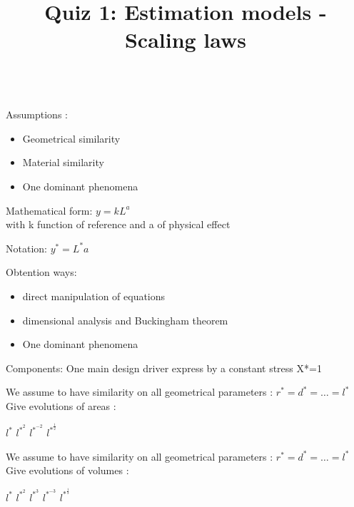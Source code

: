 \documentclass{webquiz}
\title{Quiz 1: Estimation models - Scaling laws}
\begin{document}
 
 
     \begin{discussion}\\ 
     \newline
       Assumptions : 
     \begin{minipage}[t]{.8\textwidth}
    \begin{itemize} 
     \item  Geometrical similarity  
     \item  Material similarity
     \item  One dominant phenomena
     \end{itemize}
      \end{minipage}
  

	Mathematical form:		$y=kL^a $ \\
				with k function of reference and  a of physical effect

Notation:			$y^*=L^*a$

Obtention ways:	
\begin{minipage}[t]{.8\textwidth}
\begin{itemize} 
     \item  direct manipulation of equations 
     \item  dimensional analysis and Buckingham theorem
     \item  One dominant phenomena
     \end{itemize}
\end{minipage}
Components:           One main design driver express by a constant stress X*=1

     \end{discussion} 
 
  
   \begin{question} 
    We assume to have similarity on all geometrical parameters :  $r^* = d^* = …=  l^*$ \\
    \newline
	Give evolutions of areas : 
     \begin{choice}
      \incorrect  $ l^*$
      \incorrect  $ l^{*^2}$ 
      \incorrect $ l^{*^{-2}}$ 
      \correct  $ l^{*^{\frac{1}{2}}}$ 
     \end{choice} 
   \end{question}
     
   \begin{question} 
    We assume to have similarity on all geometrical parameters :  $r^* = d^* = …=  l^*$ \\
    \newline
	Give evolutions of volumes : 
     \begin{choice}
      \incorrect  $ l^*$
      \incorrect  $ l^{*^2}$ 
      \incorrect  $ l^{*^3}$ 
      \incorrect $ l^{*^{-3}}$ 
      \correct  $ l^{*^{\frac{1}{3}}}$ 
     \end{choice} 
   \end{question}
   
\end{document}
